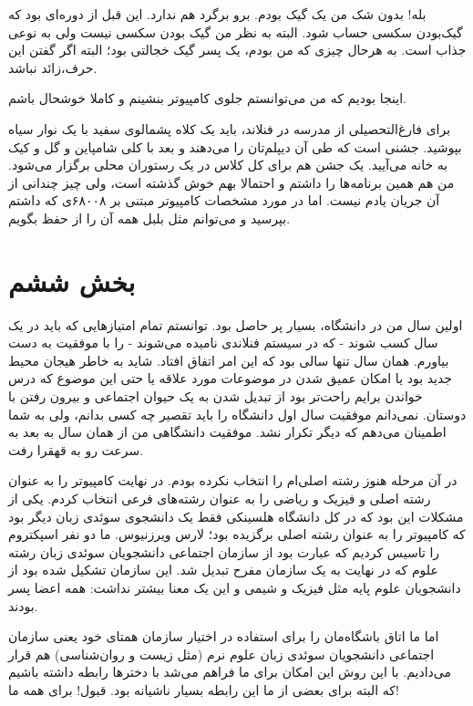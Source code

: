 بله! بدون شک من یک گیک بودم. برو برگرد هم ندارد. این قبل از دوره‌ای بود
که گیک‌بودن سکسی حساب شود. البته به نظر من گیک بودن سکسی نیست ولی به
نوعی جذاب است. به هرحال چیزی که من بودم، یک پسر گیک خجالتی بود؛ البته
اگر گفتن این حرف،زائد نباشد.

اینجا بودیم که من می‌توانستم جلوی کامپیوتر بنشینم و کاملا خوشحال باشم. 

برای فارغ‌التحصیلی از مدرسه در فنلاند، باید یک کلاه پشمالوی سفید با یک
نوار سیاه بپوشید. جشنی است که طی آن دیپلم‌تان را می‌دهند و بعد با کلی
شامپاین و گل و کیک به خانه می‌آیید. یک جشن هم برای کل کلاس در یک
رستوران محلی برگزار می‌شود. من هم همین برنامه‌ها را داشتم و احتمالا بهم
خوش گذشته است، ولی چیز چندانی از آن جریان یادم نیست. اما در مورد
مشخصات کامپیوتر مبتنی بر ۶۸۰۰۸ی که داشتم بپرسید و می‌توانم مثل بلبل همه
آن‌ را از حفظ بگویم.

\section{بخش ششم}
اولین سال من در دانشگاه، بسیار پر حاصل بود. توانستم تمام امتیازهایی که
باید در یک سال کسب شوند - که در سیستم فنلاندی 
نامیده می‌شوند - را با موفقیت به دست بیاورم. همان سال تنها سالی بود که
این امر اتفاق افتاد. شاید به خاطر هیجان محیط جدید بود یا امکان عمیق
شدن در موضوعات مورد علاقه یا حتی این موضوع که درس‌ خواندن‌ برایم راحت‌تر
بود از تبدیل شدن به یک حیوان اجتماعی و بیرون رفتن با دوستان. نمی‌دانم
موفقیت سال اول دانشگاه را باید تقصیر چه کسی بدانم، ولی به شما اطمینان
می‌دهم که دیگر تکرار نشد. موفقیت دانشگاهی من از همان سال به بعد به سرعت
رو به قهقرا رفت.

در آن مرحله هنوز رشته اصلی‌ام را انتخاب نکرده بودم. در نهایت کامپیوتر
را به عنوان رشته اصلی و فیزیک و ریاضی را به عنوان رشته‌های فرعی انتخاب
کردم. یکی از مشکلات این بود که در کل دانشگاه هلسینکی فقط یک دانشجوی
سوئدی زبان دیگر بود که کامپیوتر را به عنوان رشته اصلی برگزیده بود؛
لارس ویرزنیوس. ما دو نفر
اسپکتروم را تاسیس کردیم که عبارت بود از سازمان اجتماعی دانشجویان سوئدی
زبان رشته‌ علوم که در نهایت به یک سازمان مفرح تبدیل شد. این سازمان
تشکیل شده بود از دانشجویان علوم پایه مثل فیزیک و شیمی و این یک معنا
بیشتر نداشت: همه اعضا پسر بودند.

اما ما اتاق باشگاه‌مان را برای استفاده در اختیار سازمان همتای خود یعنی
سازمان اجتماعی دانشجویان سوئدی زبان علوم نرم (مثل زیست و روان‌شناسی) هم
قرار می‌دادیم. با این روش این امکان برای ما فراهم می‌شد با دخترها رابطه
داشته باشیم که البته برای بعضی از ما این رابطه بسیار ناشیانه
بود. قبول!‌ برای همه ما!


